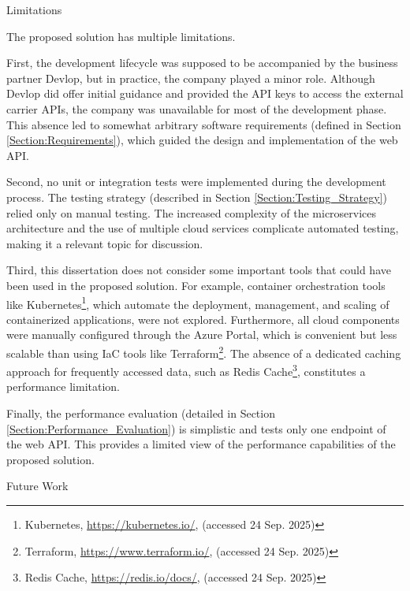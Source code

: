 \documentclass[12pt, reqno]{amsbook}
\makeatletter
\def\section{\@startsection{section}{1}%
      \z@{.5\linespacing\@plus.7\linespacing}{.25\linespacing}%
      {\normalfont\bfseries\flushleft}}
\theoremstyle{definition}
\theoremstyle{definition}
\numberwithin{section}{chapter}
\numberwithin{table}{chapter}
\numberwithin{figure}{chapter}
\makeatother
\begin{document}
\section{Limitations}
\label{Section:Limitations}

The proposed solution has multiple limitations.

First, the development lifecycle was supposed to be accompanied by the business partner Devlop, but in practice, the company played a minor role. Although Devlop did offer initial guidance and provided the \ac{API} keys to access the external carrier \acp{API}, the company was unavailable for most of the development phase. This absence led to somewhat arbitrary software requirements (defined in Section \ref{Section:Requirements}), which guided the design and implementation of the web \ac{API}.

Second, no unit or integration tests were implemented during the development process. The testing strategy (described in Section \ref{Section:Testing_Strategy}) relied only on manual testing. The increased complexity of the microservices architecture and the use of multiple cloud services complicate automated testing, making it a relevant topic for discussion.

Third, this dissertation does not consider some important tools that could have been used in the proposed solution. For example, container orchestration tools like Kubernetes\footnote{Kubernetes, \url{https://kubernetes.io/}, (accessed 24 Sep. 2025)}, which automate the deployment, management, and scaling of containerized applications, were not explored. Furthermore, all cloud components were manually configured through the Azure Portal, which is convenient but less scalable than using \ac{IaC} tools like Terraform\footnote{Terraform, \url{https://www.terraform.io/}, (accessed 24 Sep. 2025)}. The absence of a dedicated caching approach for frequently accessed data, such as Redis Cache\footnote{Redis Cache, \url{https://redis.io/docs/}, (accessed 24 Sep. 2025)}, constitutes a performance limitation.

Finally, the performance evaluation (detailed in Section \ref{Section:Performance_Evaluation}) is simplistic and tests only one endpoint of the web \ac{API}. This provides a limited view of the performance capabilities of the proposed solution.

\section{Future Work}
\label{Section:Future_Work}
\end{document}
